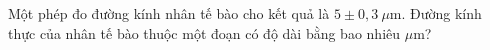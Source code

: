 \begin{ex}
Một phép đo đường kính nhân tế bào cho kết quả là $5\pm0{,}3\ \mu\text{m}$. Đường kính thực của nhân tế bào thuộc một đoạn có độ dài bằng bao nhiêu $\mu$m?
\end{ex}
